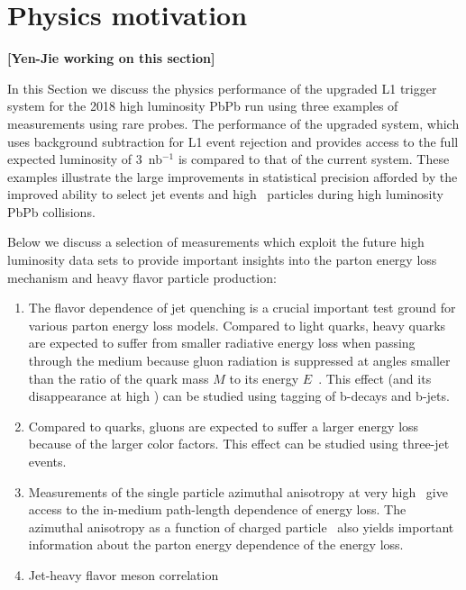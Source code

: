 \section{Physics motivation\label{sec:physHI}}
\label{sec:physics}

{\bf [Yen-Jie working on this section]}

In this Section we discuss the physics performance of the upgraded L1 trigger system for the 2018 high luminosity PbPb run using three examples of measurements using rare probes. 
The performance of the upgraded system, which uses background subtraction for L1 event rejection and provides 
access to the full expected luminosity of 3~nb$^{-1}$ is compared to that of the current system. 
These examples illustrate the large improvements in statistical precision afforded by the  improved 
ability to select jet events and high \pt\ particles during high luminosity PbPb collisions. 



Below we discuss a selection of measurements which exploit the future high luminosity data sets to 
provide important insights into the parton energy loss mechanism and heavy flavor particle production:

\begin{enumerate}
\item The flavor dependence of jet quenching is a crucial important test ground for various parton energy loss models. 
Compared to light quarks, heavy quarks are expected to suffer from smaller radiative energy loss when passing 
through the medium because gluon radiation is suppressed at angles smaller than the ratio of the quark mass $M$ to 
its energy $E$~\cite{Dokshitzer:2001zm}. This effect (and its disappearance at high \pt) can be studied using tagging
of b-decays and b-jets.
\item Compared to quarks, gluons are expected to suffer a larger 
energy loss because of the larger color factors. This effect can be studied using three-jet events.
\item Measurements of the single particle azimuthal anisotropy at very high \pt\ give access to the in-medium path-length 
dependence of energy loss. The azimuthal anisotropy as a function of charged particle \pt\ also yields 
important information about the parton energy dependence of the energy loss. 
\item Jet-heavy flavor meson correlation
\end{enumerate}


